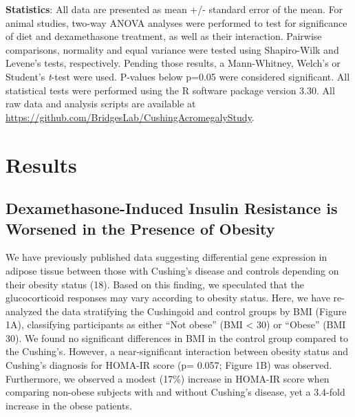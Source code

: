 \documentclass[11pt]{article} %
\begin{document}
\textbf{Statistics}: All data are presented as mean +/- standard error
of the mean. For animal studies, two-way ANOVA analyses were performed
to test for significance of diet and dexamethasone treatment, as well as
their interaction. Pairwise comparisons, normality and equal variance
were tested using Shapiro-Wilk and Levene's tests, respectively. Pending
those results, a Mann-Whitney, Welch's or Student's \emph{t}-test were
used. P-values below p=0.05 were considered significant. All statistical
tests were performed using the R software package version 3.30. All raw
data and analysis scripts are available at
\url{https://github.com/BridgesLab/CushingAcromegalyStudy}.

\section*{Results}

\subsection*{Dexamethasone-Induced Insulin Resistance is Worsened in the
Presence of Obesity
}\label{dexamethasone-induced-insulin-resistance-is-worsened-in-the-presence-of-obesity}

We have previously published data suggesting differential gene
expression in adipose tissue between those with Cushing's disease and
controls depending on their obesity status (18). Based on this finding,
we speculated that the glucocorticoid responses may vary according to
obesity status. Here, we have re-analyzed the data stratifying the
Cushingoid and control groups by BMI (Figure 1A), classifying
participants as either ``Not obese'' (BMI \textless{} 30) or ``Obese''
(BMI  30). We found no significant differences in BMI in the control
group compared to the Cushing's. However, a near-significant interaction
between obesity status and Cushing's diagnosis for HOMA-IR score (p=
0.057; Figure 1B) was observed. Furthermore, we observed a modest
(17\%) increase in HOMA-IR score when comparing non-obese subjects with
and without Cushing's disease, yet a 3.4-fold increase in the obese
patients.
\end{document}
